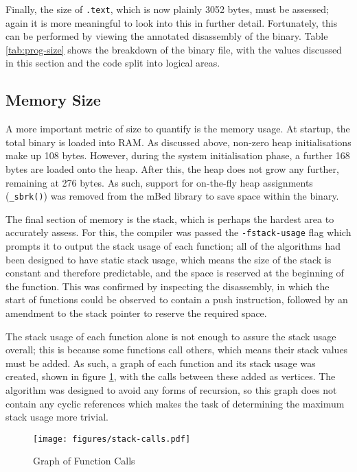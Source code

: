 Finally, the size of \verb|.text|, which is now plainly 3052 bytes, must be assessed; again it is more meaningful to look into this in further detail. Fortunately, this can be performed by viewing the annotated disassembly of the binary. Table \ref{tab:prog-size} shows the breakdown of the binary file, with the values discussed in this section and the code split into logical areas.

\subsection{Memory Size}

A more important metric of size to quantify is the memory usage. At startup, the total binary is loaded into RAM. As discussed above, non-zero heap initialisations make up 108 bytes. However, during the system initialisation phase, a further 168 bytes are loaded onto the heap. After this, the heap does not grow any further, remaining at 276 bytes. As such, support for on-the-fly heap assignments (\verb|_sbrk()|) was removed from the mBed library to save space within the binary.

The final section of memory is the stack, which is perhaps the hardest area to accurately assess. For this, the compiler was passed the \verb|-fstack-usage| flag which prompts it to output the stack usage of each function; all of the algorithms had been designed to have static stack usage, which means the size of the stack is constant and therefore predictable, and the space is reserved at the beginning of the function. This was confirmed by inspecting the disassembly, in which the start of functions could be observed to contain a push instruction, followed by an amendment to the stack pointer to reserve the required space.

The stack usage of each function alone is not enough to assure the stack usage overall; this is because some functions call others, which means their stack values must be added. As such, a graph of each function and its stack usage was created, shown in figure \ref{fig:stack-calls}, with the calls between these added as vertices. The algorithm was designed to avoid any forms of recursion, so this graph does not contain any cyclic references which makes the task of determining the maximum stack usage more trivial.

\begin{figure}[!h]
    \centering
    \texttt{[image: figures/stack-calls.pdf]}
    \caption{Graph of Function Calls}
    \label{fig:stack-calls}
\end{figure}


